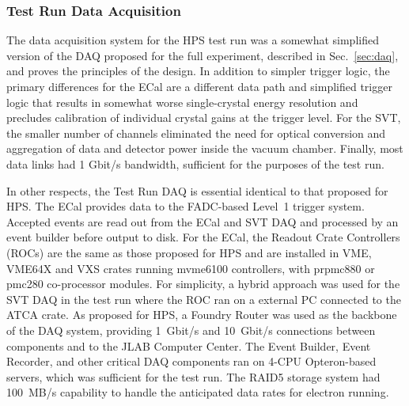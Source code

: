 
\subsubsection{Test Run Data Acquisition}
\label{sec:testrun_daq}


The data acquisition system for the HPS test run was a somewhat simplified version of the DAQ proposed for the
full experiment, described in Sec.~\ref{sec:daq}, and proves the principles of the design.  In addition to simpler trigger logic,
the primary differences for the ECal are a different data path and simplified trigger logic that results in somewhat worse
single-crystal energy resolution and precludes calibration of individual crystal gains at the trigger level.  For the SVT, the smaller
number of channels eliminated the need for optical conversion and aggregation of data and detector power inside the vacuum chamber.
Finally, most data links had 1 Gbit/s bandwidth, sufficient for the purposes of the test run.

In other respects, the Test Run DAQ is essential identical to that proposed for HPS.  The ECal provides data to the FADC-based Level~1
trigger system. Accepted events are read out from the ECal and SVT DAQ and processed by an event builder before output to disk.
For the ECal, the Readout Crate Controllers (ROCs) are the same as those proposed for HPS and are installed in VME, VME64X and VXS 
crates running mvme6100 controllers, with prpmc880 or pmc280 co-processor modules. For simplicity, a hybrid approach was 
used for the SVT DAQ in the test run where the ROC ran on a external PC connected to the ATCA crate. As proposed for HPS, a 
Foundry Router was used as the backbone of the DAQ system, providing 1~Gbit/s and 10~Gbit/s connections between components 
and to the JLAB Computer Center. The Event Builder, Event Recorder, and other critical DAQ components ran on 4-CPU Opteron-based servers, 
which was sufficient for the test run. The RAID5 storage system had 100~MB/s capability to handle the anticipated data rates for electron running.



